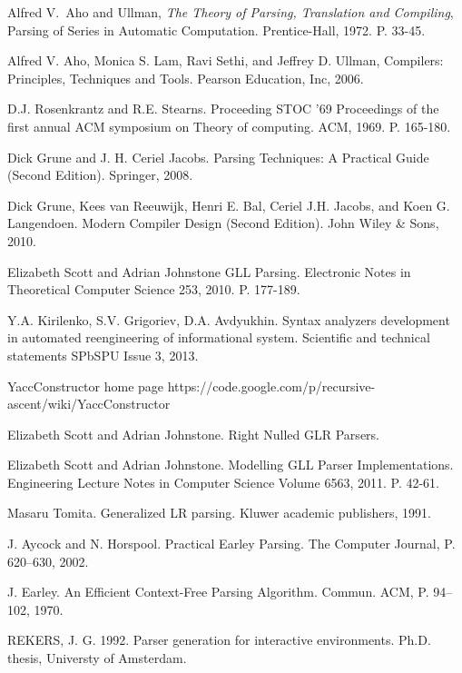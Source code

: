 \begin{thebibliography}{99}

Alfred V.~Aho and Ullman, \emph{The Theory of Parsing, Translation and Compiling}, Parsing of Series in Automatic Computation. \relax Prentice-Hall, 1972. P. 33-45.

Alfred V. Aho, Monica S. Lam, Ravi Sethi, and Jeffrey D. Ullman, Compilers: Principles, Techniques and Tools. Pearson Education, Inc, 2006.

D.J. Rosenkrantz and R.E. Stearns. Proceeding STOC '69 Proceedings of the first annual ACM symposium on Theory of computing. ACM, 1969. P. 165-180.

Dick Grune and J. H. Ceriel Jacobs. Parsing Techniques: A Practical Guide (Second Edition). Springer, 2008.

Dick Grune, Kees van Reeuwijk, Henri E. Bal, Ceriel J.H. Jacobs, and Koen G. Langendoen. Modern Compiler Design (Second Edition). John Wiley \& Sons, 2010.

Elizabeth Scott and Adrian Johnstone GLL Parsing. Electronic Notes in Theoretical Computer Science 253, 2010. P. 177-189.

Y.A. Kirilenko, S.V. Grigoriev, D.A. Avdyukhin. Syntax analyzers development in automated reengineering of informational system. Scientific and technical statements SPbSPU Issue 3, 2013.

\relax YaccConstructor home page https://code.google.com/p/recursive-ascent/wiki/YaccConstructor

Elizabeth Scott and Adrian Johnstone. Right Nulled GLR Parsers.

Elizabeth Scott and Adrian Johnstone. Modelling GLL Parser Implementations. Engineering Lecture Notes in Computer Science Volume 6563, 2011. P. 42-61.

Masaru Tomita. Generalized LR parsing. Kluwer academic publishers, 1991.

J. Aycock and N. Horspool. Practical Earley Parsing. The Computer Journal, P. 620–630, 2002.

J. Earley. An Eﬃcient Context-Free Parsing Algorithm. Commun. ACM, P. 94–102, 1970.

REKERS, J. G. 1992. Parser generation for interactive environments. Ph.D. thesis, Universty of Amsterdam.


\end{thebibliography}
